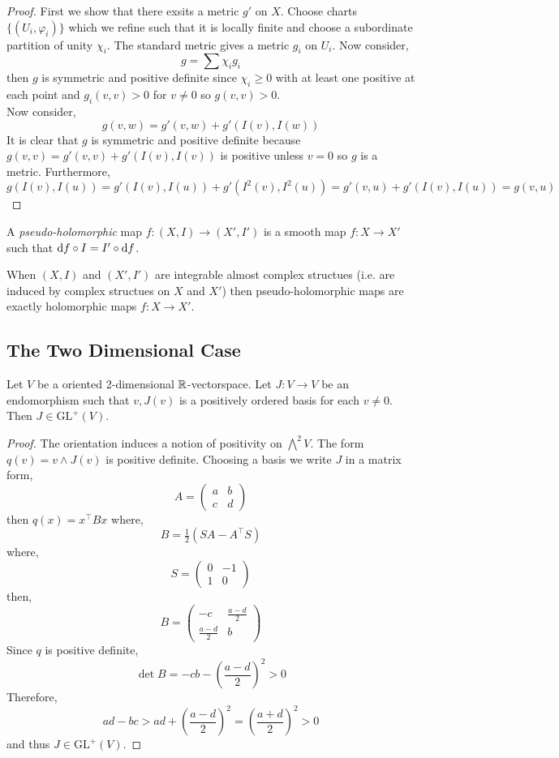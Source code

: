\documentclass[12pt]{article}
\begin{document}
\begin{proof}
First we show that there exsits a metric $g'$ on $X$. Choose charts $\{(U_i, \varphi_i)\}$ which we refine such that it is locally finite and choose a subordinate partition of unity $\chi_i$. The standard metric gives a metric $g_i$ on $U_i$. Now consider,
\[ g = \sum \chi_i g_i \]
then $g$ is symmetric and positive definite since $\chi_i \ge 0$ with at least one positive at each point and $g_i(v, v) > 0$ for $v \neq 0$ so $g(v, v) > 0$. 
\bigskip\\
Now consider,
\[ g(v, w) = g'(v, w) + g'(I(v), I(w)) \]
It is clear that $g$ is symmetric and positive definite because $g(v, v) = g'(v, v) + g'(I(v), I(v))$ is positive unless $v = 0$ so $g$ is a metric. Furthermore,
\[ g(I(v), I(u)) = g'(I(v), I(u)) + g'(I^2(v), I^2(u)) = g'(v, u) + g'(I(v), I(u)) = g(v, u) \]
\end{proof}

\begin{defn}
A \textit{pseudo-holomorphic} map $f : (X, I) \to (X', I')$ is a smooth map $f : X \to X'$ such that $\mathrm{d}{f} \circ I = I' \circ \mathrm{d}{f}$. 
\end{defn}

\begin{rmk}
When $(X, I)$ and $(X', I')$ are integrable almost complex structues (i.e. are induced by complex structues on $X$ and $X'$) then pseudo-holomorphic maps are exactly holomorphic maps $f : X \to X'$.
\end{rmk}

\subsection{The Two Dimensional Case}


\begin{lemma}
Let $V$ be a oriented 2-dimensional $\mathbb{R}$-vectorspace. Let $J : V \to V$ be an endomorphism such that $v, J(v)$ is a positively ordered basis for each $v \neq 0$. Then $J \in \mathrm{GL}^{+}(V)$.
\end{lemma}


\begin{proof}
The orientation induces a notion of positivity on $\bigwedge^2 V$. The form $q(v) = v \wedge J(v)$ is positive definite. Choosing a basis we write $J$ in a matrix form,
\[ A = 
\begin{pmatrix}
a & b 
\\
c & d 
\end{pmatrix} \]
then $q(x) = x^\top B x$ where,
\[ B = \tfrac{1}{2} (SA - A^\top S) \]
where,
\[ S = 
\begin{pmatrix}
0 & -1
\\
1 & 0
\end{pmatrix} \]
then,
\[ B = 
\begin{pmatrix}
-c & \frac{a-d}{2}
\\
\frac{a-d}{2} & b 
\end{pmatrix} \]
Since $q$ is positive definite,
\[ \det{B} = -cb - \left( \frac{a-d}{2} \right)^2 > 0 \]
Therefore,
\[ ad - bc > ad + \left( \frac{a-d}{2} \right)^2 = \left( \frac{a + d}{2} \right)^2 > 0 \]
and thus $J \in \mathrm{GL}^{+}(V)$.
\end{proof}
\end{document}
